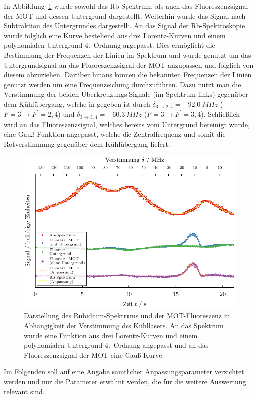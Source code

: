 \documentclass[11pt, a4paper]{article}
\numberwithin{equation}{section}
\begin{document}
In Abbildung~\ref{fig:detuning_cooling} wurde sowohl das Rb-Spektrum, als auch das Fluoreszenzsignal der MOT und dessen Untergrund dargestellt.
Weiterhin wurde das Signal nach Subtraktion des Untergrundes dargestellt.
An das Signal der Rb-Spektroskopie wurde folglich eine Kurve bestehend aus drei Lorentz-Kurven und einem polynomialen Untergrund 4.\ Ordnung angepasst.
Dies ermöglicht die Bestimmung der Frequenzen der Linien im Spektrum und wurde genutzt um das Untergrundsignal an das Fluoreszenzsignal der MOT anzupassen und folglich von diesem abzuziehen.
Darüber hinaus können die bekannten Frequenzen der Linien genutzt werden um eine Frequenzeichung durchzuführen.
Dazu nutzt man die Verstimmung der beiden Überkreuzungs-Signale (im Spektrum links) gegenüber dem Kühlübergang, welche in \cite{script} gegeben ist durch $\delta_{3 \rightarrow 2,4} = \SI{-92.0}{MHz}$ ($F=3 \rightarrow F^\prime=2,4$) und $\delta_{3 \rightarrow 3, 4} = \SI{-60.3}{MHz}$ ($F=3 \rightarrow F^\prime=3,4$).
Schließlich wird an das Fluoreszenzsignal, welches bereits vom Untergrund bereinigt wurde, eine Gauß-Funktion angepasst, welche die Zentralfrequenz und somit die Rotverstimmung gegenüber dem Kühlübergang liefert.
\begin{figure}[h]
	\centering
	\includegraphics{./figures/detuning_cooling.pdf}
	\caption{Darstellung des Rubidium-Spektrums und der MOT-Fluoreszenz in Abhängigkeit der Verstimmung des Kühllasers. An das Spektrum wurde eine Funktion aus drei Lorentz-Kurven und einem polynomialen Untergrund 4.\ Ordnung angepasst und an das Fluoreszenzsignal der MOT eine Gauß-Kurve.}
	\label{fig:detuning_cooling}
\end{figure}
Im Folgenden soll auf eine Angabe sämtlicher Anpassungsparameter verzichtet werden und nur die Parameter erwähnt werden, die für die weitere Auswertung relevant sind.
\end{document}
